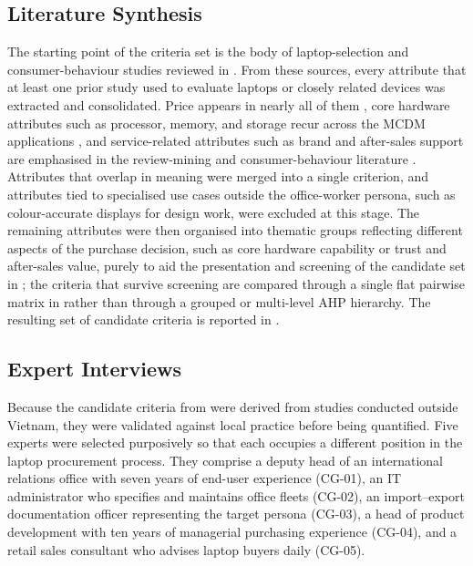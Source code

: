 \subsection{Literature Synthesis}\label{subsec:lit-synthesis}

The starting point of the criteria set is the body of laptop-selection and
consumer-behaviour studies reviewed in . From these sources,
every attribute that at least one prior study used to evaluate laptops or closely related
devices was extracted and consolidated. Price appears in nearly all of them
\parencite{sonmez_cakir_determination_2020,weng_siew_lam_evaluation_2023,liao_determinants_2022,rau_optimal_2018},
core hardware attributes such as processor, memory, and storage recur across the MCDM
applications \parencite{gaur_application_2023,maghsoudi_hybrid_2026}, and service-related
attributes such as brand and after-sales support are emphasised in the review-mining and
consumer-behaviour literature \parencite{kang_study_2022,sostar_assessment_2023}.
Attributes that overlap in meaning were merged into a single criterion, and attributes tied
to specialised use cases outside the office-worker persona, such as colour-accurate
displays for design work, were excluded at this stage. The remaining attributes were then
organised into thematic groups reflecting different aspects of the purchase decision, such
as core hardware capability or trust and after-sales value, purely to aid the presentation
and screening of the candidate set in ; the criteria that survive
screening are compared through a single flat pairwise matrix in  rather
than through a grouped or multi-level AHP hierarchy. The resulting set of candidate
criteria is reported in .

\subsection{Expert Interviews}\label{subsec:expert-interviews}

Because the candidate criteria from  were derived from studies
conducted outside Vietnam, they were validated against local practice before being
quantified. Five experts
were selected purposively so that each occupies a different position in the laptop
procurement process. They comprise a deputy head of an international relations office
with seven years of end-user experience (CG-01), an IT administrator who specifies and
maintains office fleets (CG-02), an import--export documentation officer representing the
target persona (CG-03), a head of product development with ten years of managerial
purchasing experience (CG-04), and a retail sales consultant who advises laptop buyers
daily (CG-05).

